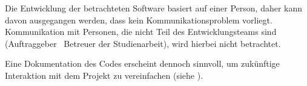 
Die Entwicklung der betrachteten Software basiert auf einer Person, daher kann davon ausgegangen werden, dass kein Kommunikationsproblem vorliegt.
Kommunikation mit Personen, die nicht Teil des Entwicklungsteams sind (Auftraggeber \bzw\ Betreuer der Studienarbeit), wird hierbei nicht betrachtet.

Eine Dokumentation des Codes erscheint dennoch sinnvoll, um zukünftige Interaktion mit dem Projekt zu vereinfachen (siehe ).
